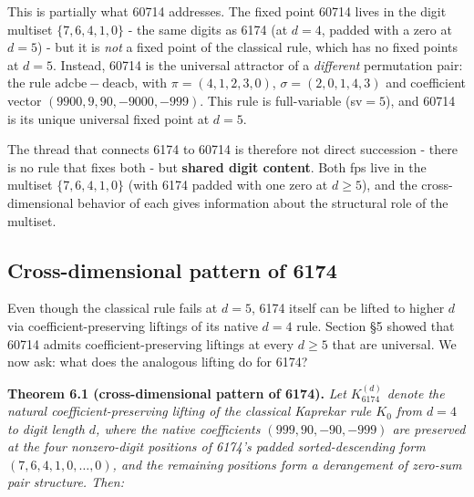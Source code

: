 \documentclass[11pt,letterpaper]{article}
\theoremstyle{paperstyle}
\theoremstyle{paperstyledef}
\theoremstyle{paperstylerem}
\begin{document}
This is partially what 60714 addresses. The fixed point 60714 lives in
the digit multiset \(\{7, 6, 4, 1, 0\}\) - the same digits as 6174 (at
\(d = 4\), padded with a zero at \(d = 5\)) - but it is \emph{not} a
fixed point of the classical rule, which has no fixed points at
\(d = 5\). Instead, 60714 is the universal attractor of a
\emph{different} permutation pair: the rule
\(\mathrm{adcbe} - \mathrm{deacb}\), with \(\pi = (4, 1, 2, 3, 0)\),
\(\sigma = (2, 0, 1, 4, 3)\) and coefficient vector
\((9900, 9, 90, -9000, -999)\). This rule is full-variable (sv\(=5\)),
and 60714 is its unique universal fixed point at \(d = 5\).

The thread that connects 6174 to 60714 is therefore not direct
succession - there is no rule that fixes both - but \textbf{shared
digit content}. Both fps live in the multiset \(\{7, 6, 4, 1, 0\}\)
(with 6174 padded with one zero at \(d \geq 5\)), and the
cross-dimensional behavior of each gives information about the
structural role of the multiset.

\hypertarget{cross-dimensional-pattern-of-6174}{%
\subsection{Cross-dimensional pattern of 6174}\label{cross-dimensional-pattern-of-6174}}

Even though the classical rule fails at \(d = 5\), 6174 itself can be
lifted to higher \(d\) via coefficient-preserving liftings of its native
\(d = 4\) rule. Section §5 showed that 60714 admits
coefficient-preserving liftings at every \(d \geq 5\) that are
universal. We now ask: what does the analogous lifting do for 6174?

\textbf{Theorem 6.1 (cross-dimensional pattern of 6174).} \emph{Let
\(K_{6174}^{(d)}\) denote the natural coefficient-preserving lifting of
the classical Kaprekar rule \(K_0\) from \(d = 4\) to digit length
\(d\), where the native coefficients \((999, 90, -90, -999)\) are
preserved at the four nonzero-digit positions of 6174's padded
sorted-descending form \((7, 6, 4, 1, 0, \ldots, 0)\), and the remaining
positions form a derangement of zero-sum pair structure. Then:}
\end{document}
